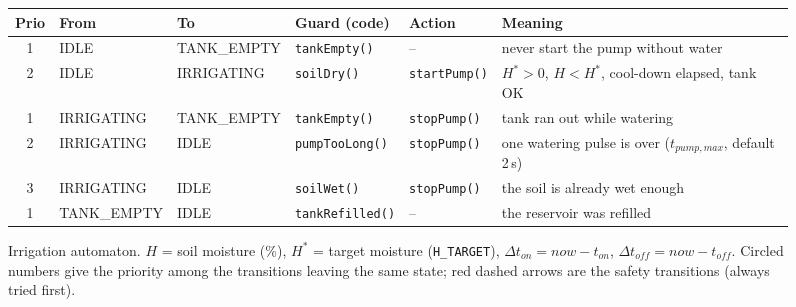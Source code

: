 \documentclass[10pt,a4paper,twocolumn]{article}
\newcommand{\code}[1]{\texttt{#1}}
\begin{document}
\begin{figure}[t]
\centering
{}
\caption{Irrigation automaton. $H$ = soil moisture (\%), $H^*$ = target moisture
(\code{H\_TARGET}), $\Delta t_{on}=\mathit{now}-t_{on}$, $\Delta t_{off}=\mathit{now}-t_{off}$.
Circled numbers give the priority among the transitions leaving the same state; red
dashed arrows are the safety transitions (always tried first).}
\label{fig:irrigation}
\vspace{0.9em}
\small
{}
\label{tab:irrigation}
\begin{tabularx}{\textwidth}{@{}c l l l l X@{}}
\toprule
Prio & From & To & Guard (code) & Action & Meaning\\
\midrule
1 & IDLE & TANK\_EMPTY & \code{tankEmpty()} & -- & never start the pump without water\\
2 & IDLE & IRRIGATING & \code{soilDry()} & \code{startPump()} & $H^*>0$, $H<H^*$, cool-down elapsed, tank OK\\
1 & IRRIGATING & TANK\_EMPTY & \code{tankEmpty()} & \code{stopPump()} & tank ran out while watering\\
2 & IRRIGATING & IDLE & \code{pumpTooLong()} & \code{stopPump()} & one watering pulse is over ($t_{pump,max}$, default 2\,s)\\
3 & IRRIGATING & IDLE & \code{soilWet()} & \code{stopPump()} & the soil is already wet enough\\
1 & TANK\_EMPTY & IDLE & \code{tankRefilled()} & -- & the reservoir was refilled\\
\bottomrule
\end{tabularx}
\end{figure}
\end{document}
